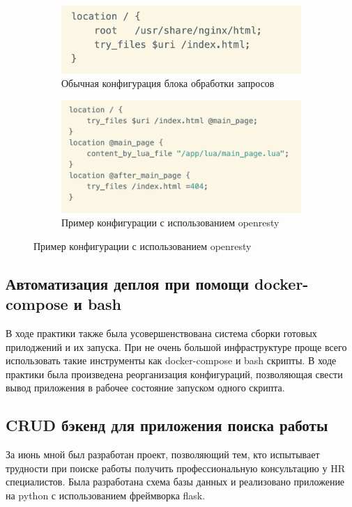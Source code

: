 \documentclass[a4papaer,12pt]{article}
\begin{document}
\begin{figure}[H]
    \begin{subfigure}[b]{.49\linewidth}
    \includegraphics[width=\linewidth]{1}
    \caption{Обычная конфигурация блока обработки запросов}
    \end{subfigure}
    \begin{subfigure}[b]{.49\linewidth}
    \includegraphics[width=\linewidth]{2}
    \caption{Пример конфигурации с использованием openresty}
    \end{subfigure}
\end{figure}

\subsection{Автоматизация деплоя при помощи docker-compose и bash}

В ходе практики также была усовершенствована система сборки готовых прилоджений и их 
запуска. При не очень большой инфраструктуре проще всего использовать такие инструменты
как docker-compose и bash скрипты. В ходе практики была произведена реорганизация 
конфигураций, позволяющая свести вывод приложения в рабочее состояние запуском одного скрипта.

\subsection{CRUD бэкенд для приложения поиска работы}

За июнь мной был разработан проект, позволяющий тем, кто испытывает трудности при поиске работы
получить профессиональную консультацию у HR специалистов. Была разработана схема базы данных 
и реализовано приложение\cite{cvtr_api_docs} на python с использованием фреймворка flask\cite{flask}.  
\end{document}
